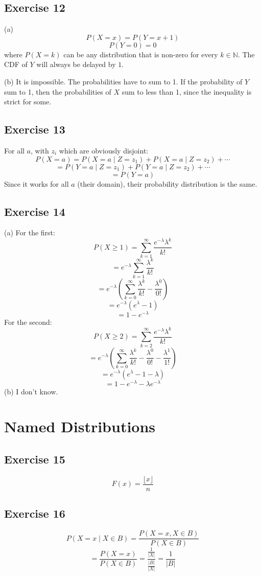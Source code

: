 \documentclass{book}
\begin{document}
\subsection*{Exercise 12}
(a)
$$P(X = x) = P(Y = x + 1)$$
$$P(Y = 0) = 0$$
where $P(X = k)$ can be any distribution that is non-zero for every $k \in \mathbb{N}$. The CDF of $Y$ will always be delayed by $1$.

\noindent
(b)
It is impossible. The probabilities have to sum to 1. If the probability of $Y$ sum to 1, then the probabilities of $X$ sum to less than 1, since the inequality is strict for some.

\subsection*{Exercise 13}
For all $a$, with $z_i$ which are obviously disjoint:
$$P(X = a) = P(X = a \mid Z = z_1) + P(X = a \mid Z = z_2) + \cdots$$
$$= P(Y = a \mid Z = z_1) + P(Y = a \mid Z = z_2) + \cdots$$
$$= P(Y = a)$$
Since it works for all $a$ (their domain), their probability distribution is the same.

\subsection*{Exercise 14}
(a)
For the first:
$$P(X \geq 1) = \sum_{k = 1}^\infty \frac{e^{-\lambda} \lambda^k}{k!}$$
$$= e^{-\lambda} \sum_{k = 1}^\infty \frac{ \lambda^k}{k!}$$
$$= e^{-\lambda} \left(\sum_{k = 0}^\infty \frac{ \lambda^k}{k!} - \frac{\lambda^0}{0!}\right)$$
$$= e^{-\lambda} (e^\lambda - 1)$$
$$= 1 - e^{-\lambda}$$
For the second:
$$P(X \geq 2) = \sum_{k = 2}^\infty \frac{e^{-\lambda} \lambda^k}{k!}$$
$$= e^{-\lambda} \left(\sum_{k = 0}^\infty \frac{ \lambda^k}{k!} - \frac{\lambda^0}{0!} - \frac{\lambda^1}{1!}\right)$$
$$= e^{-\lambda} (e^\lambda - 1 - \lambda)$$
$$= 1 - e^{-\lambda} - \lambda e^{-\lambda}$$
(b) I don't know.

\section{Named Distributions}

\subsection*{Exercise 15}
$$F(x) = \frac{\lfloor x \rfloor}{n}$$

\subsection*{Exercise 16}
$$P(X = x \mid X \in B) = \frac{P(X = x, X \in B)}{P(X \in B)}$$
$$= \frac{P(X = x)}{P(X \in B)} = \frac{\frac{1}{|X|}}{\frac{|B|}{|X|}} = \frac{1}{|B|}$$
\end{document}
